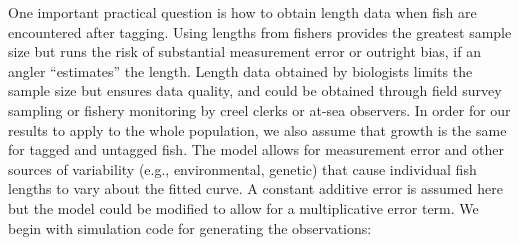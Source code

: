 \documentclass[
]{krantz}
\begin{document}
One important practical question is how to obtain length data when fish are encountered after tagging. Using lengths from fishers provides the greatest sample size but runs the risk of substantial measurement error or outright bias, if an angler ``estimates'' the length. Length data obtained by biologists limits the sample size but ensures data quality, and could be obtained through field survey sampling or fishery monitoring by creel clerks or at-sea observers. In order for our results to apply to the whole population, we also assume that growth is the same for tagged and untagged fish. The model allows for measurement error and other sources of variability (e.g., environmental, genetic) that cause individual fish lengths to vary about the fitted curve. A constant additive error is assumed here but the model could be modified to allow for a multiplicative error term. We begin with simulation code for generating the observations:
\end{document}
